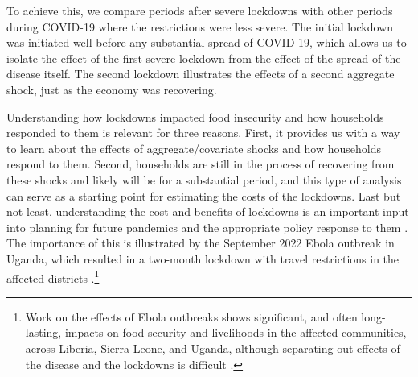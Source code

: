 \documentclass{wber}
\begin{document}
To achieve this, we compare periods after severe lockdowns with other
periods during COVID-19 where the restrictions were less severe. The
initial lockdown was initiated well before any substantial spread of
COVID-19, which allows us to isolate the effect of the first severe
lockdown from the effect of the spread of the disease itself. The second
lockdown illustrates the effects of a second aggregate shock, just as
the economy was recovering.

Understanding how lockdowns impacted food insecurity and how households
responded to them is relevant for three reasons. First, it provides us
with a way to learn about the effects of aggregate/covariate shocks and
how households respond to them. Second, households are still in the
process of recovering from these shocks and likely will be for a
substantial period, and this type of analysis can serve as a starting
point for estimating the costs of the lockdowns. Last but not least,
understanding the cost and benefits of lockdowns is an important input
into planning for future pandemics and the appropriate policy response
to them \citep{World-Health-Organization2022}. The importance of this is
illustrated by the September 2022 Ebola outbreak in Uganda, which
resulted in a two-month lockdown with travel restrictions in the
affected districts
\citep{Makerere-University-School-of-Statistics-and-Planning2023}.\footnote{Work
  on the effects of Ebola outbreaks shows significant, and often
  long-lasting, impacts on food security and livelihoods in the affected
  communities, across Liberia, Sierra Leone, and Uganda, although
  separating out effects of the disease and the lockdowns is difficult
  \citep{Langlay2014, Himelein2015, Gatiso2018, Djomaleu2022, Makerere-University-School-of-Statistics-and-Planning2023}.}
\end{document}
